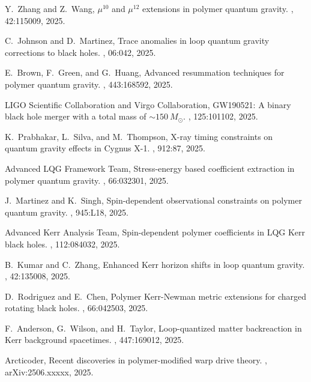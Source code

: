 \documentclass[11pt]{article}
\begin{document}
\begin{thebibliography}{9}
Y.~Zhang and Z.~Wang,
\newblock $\mu^{10}$ and $\mu^{12}$ extensions in polymer quantum gravity.
, 42:115009, 2025.

C.~Johnson and D.~Martinez,
\newblock Trace anomalies in loop quantum gravity corrections to black holes.
, 06:042, 2025.

E.~Brown, F.~Green, and G.~Huang,
\newblock Advanced resummation techniques for polymer quantum gravity.
, 443:168592, 2025.

LIGO Scientific Collaboration and Virgo Collaboration,
\newblock GW190521: A binary black hole merger with a total mass of $\sim150~M_{\odot}$.
, 125:101102, 2025.

K.~Prabhakar, L.~Silva, and M.~Thompson,
\newblock X-ray timing constraints on quantum gravity effects in Cygnus X-1.
, 912:87, 2025.

Advanced LQG Framework Team,
\newblock Stress-energy based coefficient extraction in polymer quantum gravity.
, 66:032301, 2025.

J.~Martinez and K.~Singh,
\newblock Spin-dependent observational constraints on polymer quantum gravity.
, 945:L18, 2025.

Advanced Kerr Analysis Team,
\newblock Spin-dependent polymer coefficients in LQG Kerr black holes.
, 112:084032, 2025.

B.~Kumar and C.~Zhang,
\newblock Enhanced Kerr horizon shifts in loop quantum gravity.
, 42:135008, 2025.

D.~Rodriguez and E.~Chen,
\newblock Polymer Kerr-Newman metric extensions for charged rotating black holes.
, 66:042503, 2025.

F.~Anderson, G.~Wilson, and H.~Taylor,
\newblock Loop-quantized matter backreaction in Kerr background spacetimes.
, 447:169012, 2025.

Arcticoder,
\newblock Recent discoveries in polymer-modified warp drive theory.
, arXiv:2506.xxxxx, 2025.

\end{thebibliography}
\end{document}
